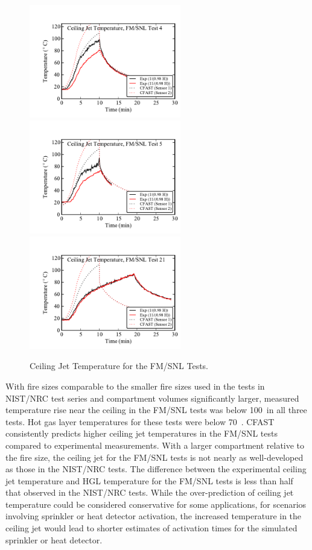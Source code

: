 \begin{figure}[p]
\begin{center}
\includegraphics[width=2.6in]{FIGURES/FM_SNL/FM_SNL_04_Ceiling_Jet} \\
\includegraphics[width=2.6in]{FIGURES/FM_SNL/FM_SNL_05_Ceiling_Jet} \\
\includegraphics[width=2.6in]{FIGURES/FM_SNL/FM_SNL_21_Ceiling_Jet} 
\end{center}
\caption{Ceiling Jet Temperature for the FM/SNL Tests.} \label{FM_SNL_HGL}
\end{figure}

With fire sizes comparable to the smaller fire sizes used in the tests in NIST/NRC test series and compartment volumes significantly larger, measured temperature rise near the ceiling in the FM/SNL tests was below 100~\degc in all three tests.  Hot gas layer temperatures for these tests were below 70~\degc.  CFAST consistently predicts higher ceiling jet temperatures in the FM/SNL tests compared to experimental measurements.  With a larger compartment relative to the fire size, the ceiling jet for the FM/SNL tests is not nearly as well-developed as those in the NIST/NRC tests.  The difference between the experimental ceiling jet temperature and HGL temperature for the FM/SNL tests is less than half that observed in the NIST/NRC tests.  While the over-prediction of ceiling jet temperature could be considered conservative for some applications, for scenarios involving sprinkler or heat detector activation, the increased temperature in the ceiling jet would lead to shorter estimates of activation times for the simulated sprinkler or heat detector.

